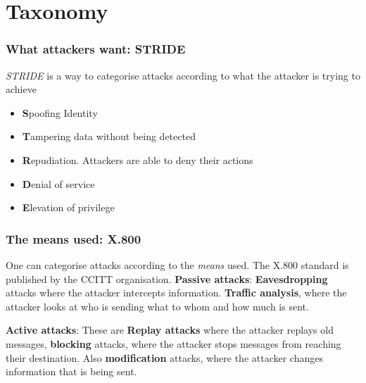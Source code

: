 \section{Taxonomy}
    \begin{frame}
        \frametitle{What attackers want: STRIDE}
            \textit{STRIDE} is a way to categorise attacks according to what the attacker is trying to achieve
            \begin{itemize}
                \item \textbf{S}poofing Identity
                \item \textbf{T}ampering data without being detected
                \item \textbf{R}epudiation. Attackers are able to deny their actions
                \item \textbf{D}enial of service
                \item \textbf{E}levation of privilege
            \end{itemize}
    \end{frame}
    \begin{frame}
        \frametitle{The means used: X.800}
            One can categorise attacks according to the \textit{means} used. The X.800 standard is published by the CCITT organisation.
            \textbf{Passive attacks}: \textbf{Eavesdropping} attacks where the attacker intercepts information. \textbf{Traffic analysis}, where the attacker looks at who is sending what to whom and how much is sent.
            
            \textbf{Active attacks}: These are \textbf{Replay attacks} where the attacker replays old messages, \textbf{blocking} attacks, where the attacker stops messages from reaching their destination. Also \textbf{modification} attacks, where the attacker changes information that is being sent. 
    \end{frame}
